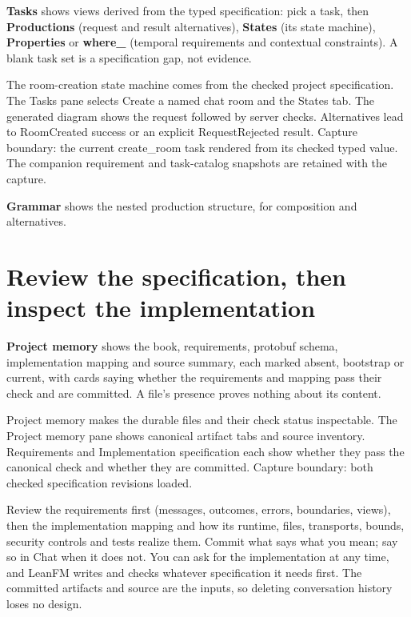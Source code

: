 \textbf{Tasks} shows views derived from the typed specification: pick a task, then
\textbf{Productions} (request and result alternatives), \textbf{States} (its state
machine), \textbf{Properties} or \textbf{where\_} (temporal requirements and
contextual constraints). A blank task set is a specification gap, not evidence.

  {The room-creation state machine comes from the checked project specification.}
  {The Tasks pane selects Create a named chat room and the States tab. The generated diagram shows the request followed by server checks. Alternatives lead to RoomCreated success or an explicit RequestRejected result.}
  {Capture boundary: the current create\_room task rendered from its checked typed value. The companion requirement and task-catalog snapshots are retained with the capture.}

\textbf{Grammar} shows the nested production structure, for composition and
alternatives.

\section{Review the specification, then inspect the implementation}

\textbf{Project memory} shows the book, requirements, protobuf schema,
implementation mapping and source summary, each marked absent, bootstrap or
current, with cards saying whether the requirements and mapping pass their check
and are committed. A file's presence proves nothing about its content.

  {Project memory makes the durable files and their check status inspectable.}
  {The Project memory pane shows canonical artifact tabs and source inventory. Requirements and Implementation specification each show whether they pass the canonical check and whether they are committed.}
  {Capture boundary: both checked specification revisions loaded.}

Review the requirements first (messages, outcomes, errors, boundaries, views),
then the implementation mapping and how its runtime, files, transports, bounds,
security controls and tests realize them. Commit what says what you mean; say so
in Chat when it does not. You can ask for the implementation at any time, and
LeanFM writes and checks whatever specification it needs first. The committed
artifacts and source are the inputs, so deleting conversation history loses no
design.

